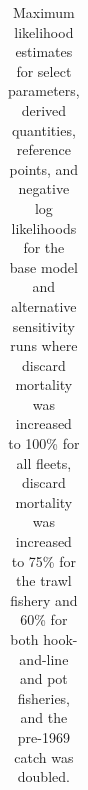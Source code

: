 \documentclass[
  english,
]{article}
\begin{document}
\pagebreak

\begin{landscape}

\begingroup
\fontsize{8.0pt}{9.0pt}\selectfont

\begin{longtable}{l>{\raggedleft\arraybackslash}p{\dimexpr 90.00pt -2\tabcolsep-1.5\arrayrulewidth}rr>{\raggedleft\arraybackslash}p{\dimexpr 90.00pt -2\tabcolsep-1.5\arrayrulewidth}}

\caption{\label{tbl-sens-5}Maximum likelihood estimates for select
parameters, derived quantities, reference points, and negative log
likelihoods for the base model and alternative sensitivity runs where
discard mortality was increased to 100\% for all fleets, discard
mortality was increased to 75\% for the trawl fishery and 60\% for both
hook-and-line and pot fisheries, and the pre-1969 catch was doubled.}

\tabularnewline


\end{longtable}
\end{landscape}
\end{document}
